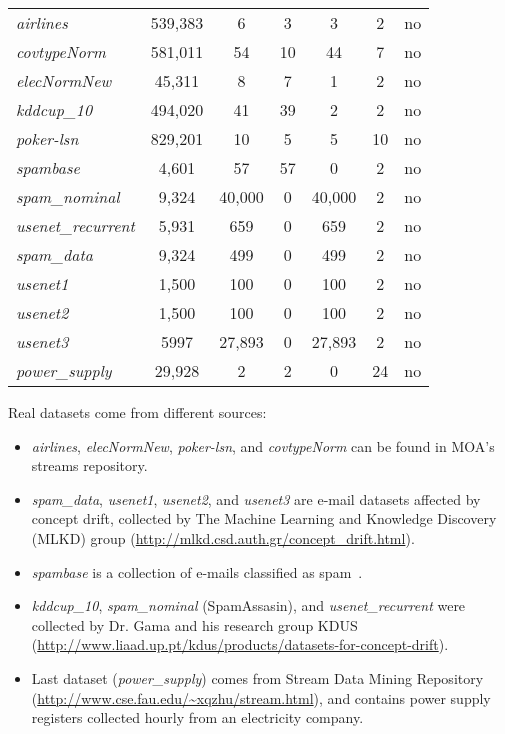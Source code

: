 \documentclass[preprint,12pt]{elsarticle}
\begin{document}
\begin{table}[!htp]
{\begin{tabular}{|l||c||c||c||c||c||c|}
\textit{airlines} & 539,383 & 6 & 3 & 3 & 2 & no\\ 
\textit{covtypeNorm} & 581,011 & 54 & 10 & 44 & 7 & no\\ 
\textit{elecNormNew} & 45,311 & 8 & 7 & 1 & 2 & no \\ 
\textit{kddcup\_10} & 494,020 & 41 & 39 & 2 & 2 & no\\ 
\textit{poker-lsn} & 829,201 & 10 & 5 & 5 & 10 & no\\ 
\textit{spambase} & 4,601 & 57 & 57 & 0 & 2 & no\\ 
\textit{spam\_nominal} & 9,324 & 40,000 & 0 & 40,000 & 2 & no\\ 
\textit{usenet\_recurrent} & 5,931 & 659 & 0 & 659 & 2 & no\\ 
\textit{spam\_data} & 9,324 & 499 & 0 & 499 & 2 & no\\ 
\textit{usenet1} & 1,500 & 100 & 0 & 100 & 2 & no\\ 
\textit{usenet2} & 1,500 & 100 & 0 & 100 & 2 & no\\ 
\textit{usenet3} & 5997 & 27,893 & 0 & 27,893 & 2 & no\\ 
\textit{power\_supply} & 29,928 & 2 & 2 & 0 & 24 & no\\ 
  \hline
  \end{tabular}
}
\end{table}

Real datasets come from different sources:

\begin{itemize}
	\item \textit{airlines}, \textit{elecNormNew}, \textit{poker-lsn}, and \textit{covtypeNorm} can be found in MOA's streams repository.
	\item \textit{spam\_data}, \textit{usenet1}, \textit{usenet2}, and \textit{usenet3} are e-mail datasets affected by concept drift, collected by The Machine Learning and Knowledge Discovery (MLKD) group (\url{http://mlkd.csd.auth.gr/concept_drift.html}).
	\item \textit{spambase} is a collection of e-mails classified as spam~\cite{bache13}. 
	\item \textit{kddcup\_10}, \textit{spam\_nominal} (SpamAssasin), and \textit{usenet\_recurrent} were collected by Dr. Gama and his research group KDUS (\url{http://www.liaad.up.pt/kdus/products/datasets-for-concept-drift}). 
	\item Last dataset (\textit{power\_supply}) comes from Stream Data Mining Repository (\url{http://www.cse.fau.edu/~xqzhu/stream.html}), and contains power supply registers collected hourly from an electricity company.
\end{itemize}
 
\end{document}
